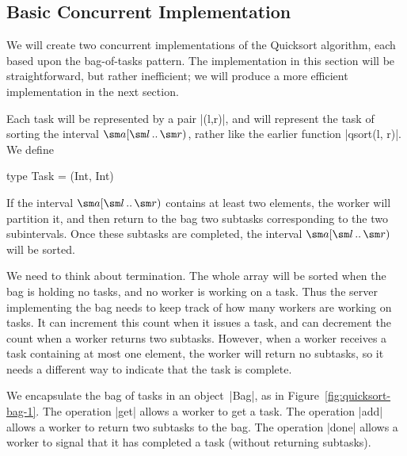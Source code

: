 
\subsection{Basic Concurrent Implementation}

We will create two concurrent implementations of the Quicksort algorithm, each
based upon the bag-of-tasks pattern.  The implementation in this section will
be straightforward, but rather inefficient; we will produce a more efficient
implementation in the next section.

Each task will be represented by a pair |(l,r)|, and will represent the task
of sorting the interval $\sm a\interval{\sm l}{\sm r}$, rather like the
earlier function |qsort(l, r)|.  We define
\begin{scala}
  type Task = (Int, Int)
\end{scala}
%
If the interval $\sm a\interval{\sm l}{\sm r}$ contains at least two elements,
the worker will partition it, and then return to the bag two subtasks
corresponding to the two subintervals.  Once these subtasks are completed, the
interval $\sm a\interval{\sm l}{\sm r}$ will be sorted.

We need to think about termination.  The whole array will be sorted when the
bag is holding no tasks, and no worker is working on a task.  Thus the server
implementing the bag needs to keep track of how many workers are working on
tasks.  It can increment this count when it issues a task, and can decrement
the count when a worker returns two subtasks.  However, when a worker receives
a task containing at most one element, the worker will return no subtasks, so
it needs a different way to indicate that the task is complete.

We encapsulate the bag of tasks in an object~|Bag|, as in
Figure~\ref{fig:quicksort-bag-1}.   The operation |get| allows a worker to get
a task.  The operation |add| allows a worker to return two subtasks to the
bag.  The operation |done| allows a worker to signal that it has completed a
task (without returning subtasks).  


